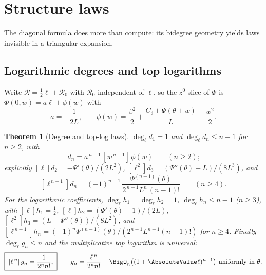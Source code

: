 \documentclass[11pt,oneside]{article}
\numberwithin{equation}{section}
\newtheorem{theorem}{Theorem}[section]
\theoremstyle{definition}
\theoremstyle{remark}
\newcommand{\Csharp}{C_{\sharp}}
\begin{document}
\section{Structure laws}
\label{sec:structure}

The diagonal formula does more than compute: its bidegree geometry
yields laws invisible in a triangular expansion.

\subsection{Logarithmic degrees and top logarithms}

Write $\mathcal R=\tfrac12\ell+\mathcal R_0$ with $\mathcal R_0$
independent of $\ell$, so the $z^{0}$ slice of $\Phi$ is
$\Phi(0,w)=a\ell+\phi(w)$ with
\begin{equation}
 a=-\frac1{2L},
 \qquad
 \phi(w)=\frac{\beta^{2}}2+\frac{\Csharp+\Psi(\theta+w)}L
 -\frac{w^{2}}2.
 \label{eq:a-phi}
\end{equation}

\begin{theorem}[Degree and top-log laws]
\label{thm:top-log}
$\deg_\ell d_1=1$ and $\deg_\ell d_n\le n-1$ for $n\ge2$, with
\begin{equation}
 [\ell^{\,n-1}]\,d_n=a^{\,n-1}\,[w^{\,n-1}]\,\phi(w)
 \qquad(n\ge2);
 \label{eq:d-top-log}
\end{equation}
explicitly $[\ell]d_2=-\Psi'(\theta)/(2L^{2})$,
$[\ell^{2}]d_3=(\Psi''(\theta)-L)/(8L^{3})$, and
\[
 [\ell^{\,n-1}]d_n
 =(-1)^{n-1}\,
 \frac{\Psi^{(n-1)}(\theta)}{2^{\,n-1}L^{n}\,(n-1)!}
 \qquad(n\ge4).
\]
For the logarithmic coefficients,
$\deg_\ell h_1=\deg_\ell h_2=1$, $\deg_\ell h_n\le n-1$
($n\ge3$), with $[\ell]h_1=\tfrac12$,
$[\ell]h_2=(\Psi'(\theta)-1)/(2L)$,
$[\ell^{2}]h_3=(L-\Psi''(\theta))/(8L^{2})$, and
$[\ell^{\,n-1}]h_n
=(-1)^{n}\Psi^{(n-1)}(\theta)/(2^{n-1}L^{n-1}(n-1)!)$ for
$n\ge4$.  Finally $\deg_\ell g_n\le n$ and the multiplicative top
logarithm is \emph{universal}:
\begin{equation}
 \boxed{\;[\ell^{\,n}]\,g_n=\frac1{2^{n}n!},\;}
 \qquad
 g_n=\frac{\ell^{\,n}}{2^{n}n!}
 +\BigO_n\bigl((1+\AbsoluteValue\ell)^{n-1}\bigr)
 \text{ uniformly in }\theta.
 \label{eq:universal-top-log}
\end{equation}
\end{theorem}
\end{document}
